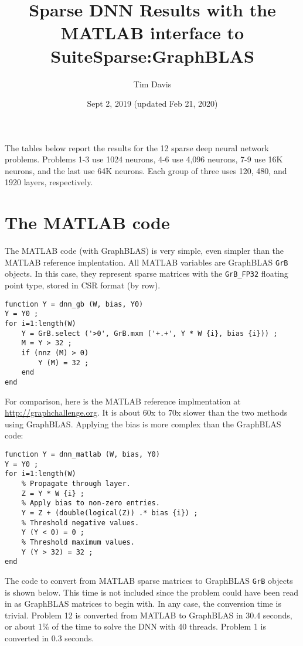 \documentclass[12pt]{article}
\title{Sparse DNN Results with the MATLAB interface to SuiteSparse:GraphBLAS}
\author{Tim Davis}
\date{Sept 2, 2019 (updated Feb 21, 2020)}
\begin{document}
\maketitle

The tables below report the results for the 12 sparse deep neural network
problems.  Problems 1-3 use 1024 neurons, 4-6 use 4,096 neurons, 7-9 use 16K
neurons, and the last use 64K neurons.  Each group of three uses 120, 480, and
1920 layers, respectively.

\section{The MATLAB code}

The MATLAB code (with GraphBLAS) is very simple, even simpler than the MATLAB
reference implentation.  All MATLAB variables are GraphBLAS \verb'GrB' objects.
In this case, they represent sparse matrices with the \verb'GrB_FP32' floating
point type, stored in CSR format (by row).

{\footnotesize
\begin{verbatim}
function Y = dnn_gb (W, bias, Y0)
Y = Y0 ;
for i=1:length(W)
    Y = GrB.select ('>0', GrB.mxm ('+.+', Y * W {i}, bias {i})) ;
    M = Y > 32 ;
    if (nnz (M) > 0)
        Y (M) = 32 ;
    end
end
\end{verbatim}}

For comparison, here is the MATLAB reference implmentation at \newline
\url{http://graphchallenge.org}.  It is about 60x to 70x slower than the two
methods using GraphBLAS.  Applying the bias is more complex than the GraphBLAS
code:

{\footnotesize
\begin{verbatim}
function Y = dnn_matlab (W, bias, Y0)
Y = Y0 ;
for i=1:length(W)
    % Propagate through layer.
    Z = Y * W {i} ;
    % Apply bias to non-zero entries.
    Y = Z + (double(logical(Z)) .* bias {i}) ;
    % Threshold negative values.
    Y (Y < 0) = 0 ;
    % Threshold maximum values.
    Y (Y > 32) = 32 ;
end
\end{verbatim}}

The code to convert from MATLAB sparse matrices to GraphBLAS \verb'GrB' objects
is shown below.  This time is not included since the problem could have been
read in as GraphBLAS matrices to begin with.  In any case, the conversion time
is trivial.  Problem 12 is converted from MATLAB to GraphBLAS in 30.4 seconds,
or about 1\% of the time to solve the DNN with 40 threads.  Problem 1 is
converted in 0.3 seconds.
\end{document}
